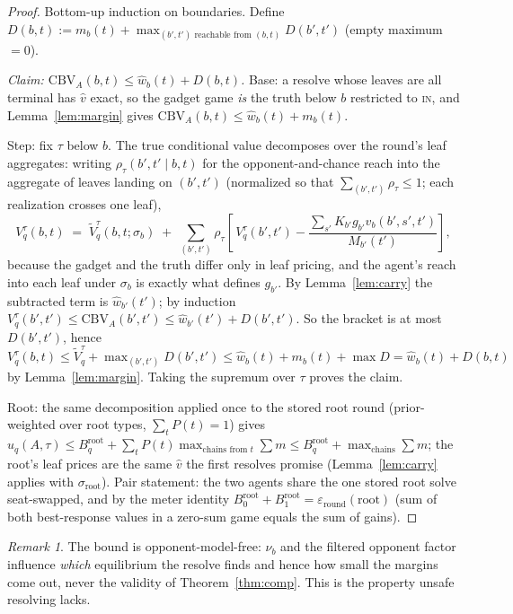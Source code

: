 \documentclass[11pt]{article}
\theoremstyle{plain}
\theoremstyle{definition}
\theoremstyle{remark}
\newtheorem{remark}[theorem]{Remark}
\newcommand{\CBV}{\mathrm{CBV}}
\begin{document}
\begin{proof}
Bottom-up induction on boundaries. Define
$D(b,t) := m_b(t) + \max_{(b',t') \text{ reachable from } (b,t)} D(b',t')$
(empty maximum $=0$).

\emph{Claim: $\CBV_A(b,t) \le \hat w_b(t) + D(b,t)$.}
Base: a resolve whose leaves are all terminal has $\hat v$ exact, so
the gadget game \emph{is} the truth below $b$ restricted to
\textsc{in}, and Lemma~\ref{lem:margin} gives
$\CBV_A(b,t) \le \hat w_b(t) + m_b(t)$.

Step: fix $\tau$ below $b$. The true conditional value decomposes over
the round's leaf aggregates: writing $\rho_\tau(b',t' \mid b,t)$ for
the opponent-and-chance reach into the aggregate of leaves landing on
$(b',t')$ (normalized so that $\sum_{(b',t')} \rho_\tau \le 1$;
each realization crosses one leaf),
\[
V^{\tau}_q(b,t) \;=\; \tilde V^{\tau}_q(b,t;\sigma_b)
\;+\; \sum_{(b',t')} \rho_\tau \left[\, V^{\tau}_q(b',t') -
\frac{\sum_{s'} K_{b'} g_{b'} \hat v_b(b',s',t')}{M_{b'}(t')} \right],
\]
because the gadget and the truth differ only in leaf pricing, and the
agent's reach into each leaf under $\sigma_b$ is exactly what defines
$g_{b'}$. By Lemma~\ref{lem:carry} the subtracted term is
$\hat w_{b'}(t')$; by induction
$V^{\tau}_q(b',t') \le \CBV_A(b',t') \le \hat w_{b'}(t') + D(b',t')$.
So the bracket is at most $D(b',t')$, hence
$V^{\tau}_q(b,t) \le \tilde V^{\tau}_q + \max_{(b',t')} D(b',t')
\le \hat w_b(t) + m_b(t) + \max D = \hat w_b(t) + D(b,t)$
by Lemma~\ref{lem:margin}. Taking the supremum over $\tau$ proves the
claim.

Root: the same decomposition applied once to the stored root round
(prior-weighted over root types, $\sum_t P(t) = 1$) gives
$u_q(A,\tau) \le B^{\mathrm{root}}_q + \sum_t P(t) \max_{\text{chains from } t} \sum m
\le B^{\mathrm{root}}_q + \max_{\text{chains}} \sum m$; the root's
leaf prices are the same $\hat v$ the first resolves promise
(Lemma~\ref{lem:carry} applies with $\sigma_{\mathrm{root}}$).
Pair statement: the two agents share the one stored root solve
seat-swapped, and by the meter identity
$B^{\mathrm{root}}_0 + B^{\mathrm{root}}_1 =
\varepsilon_{\mathrm{round}}(\mathrm{root})$ (sum of both
best-response values in a zero-sum game equals the sum of gains).
\end{proof}

\begin{remark}
The bound is opponent-model-free: $\nu_b$ and the filtered opponent
factor influence \emph{which} equilibrium the resolve finds and hence
how small the margins come out, never the validity of
Theorem~\ref{thm:comp}. This is the property unsafe resolving lacks.
\end{remark}
\end{document}
